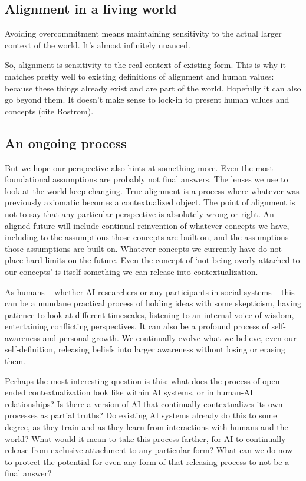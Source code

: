 \documentclass[12pt]{article}
\begin{document}
\subsection{Alignment in a living world}

Avoiding overcommitment means maintaining sensitivity to the actual larger context of the world. It's almost infinitely nuanced. 

So, alignment is sensitivity to the real context of existing form. This is why it matches pretty well to existing definitions of alignment and human values: because these things already exist and are part of the world. Hopefully it can also go beyond them. It doesn't make sense to lock-in to present human values and concepts (cite Bostrom). 


\subsection{An ongoing process}

But we hope our perspective also hints at something more. Even the most foundational assumptions are probably not final answers. The lenses we use to look at the world keep changing. True alignment is a process where whatever was previously axiomatic becomes a contextualized object. The point of alignment is not to say that any particular perspective is absolutely wrong or right. An aligned future will include continual reinvention of whatever concepts we have, including to the assumptions those concepts are built on, and the assumptions those assumptions are built on. Whatever concepts we currently have do not place hard limits on the future. Even the concept of `not being overly attached to our concepts' is itself something we can release into contextualization.

As humans -- whether AI researchers or any participants in social systems -- this can be a mundane practical process of holding ideas with some skepticism, having patience to look at different timescales, listening to an internal voice of wisdom, entertaining conflicting perspectives. It can also be a profound process of self-awareness and personal growth. We continually evolve what we believe, even our self-definition, releasing beliefs into larger awareness without losing or erasing them. 

Perhaps the most interesting question is this: what does the process of open-ended contextualization look like within AI systems, or in human-AI relationships? Is there a version of AI that continually contextualizes its own processes as partial truths? Do existing AI systems already do this to some degree, as they train and as they learn from interactions with humans and the world? What would it mean to take this process farther, for AI to continually release from exclusive attachment to any particular form? What can we do now to protect the potential for even any form of that releasing process to not be a final answer?
\end{document}
